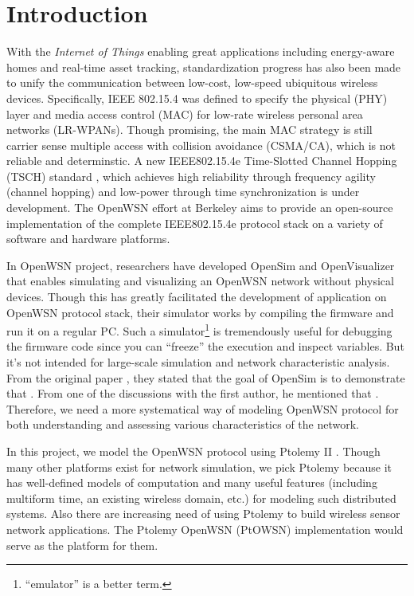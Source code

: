 \section{Introduction}
\label{sec:introduction}

With the {\em Internet of Things} enabling great applications including energy-aware homes and real-time asset tracking, standardization progress has also been made to unify the communication between low-cost, low-speed ubiquitous wireless devices. Specifically, IEEE 802.15.4 \cite{IEEE802.15.4} was defined to specify the physical (PHY) layer and media access control (MAC) for low-rate wireless personal area networks (LR-WPANs). Though promising, the main MAC strategy is still carrier sense multiple access with collision avoidance (CSMA/CA), which is not reliable and determinstic. A new IEEE802.15.4e Time-Slotted Channel Hopping (TSCH) standard \cite{IEEE802.15.4e}, which achieves high reliability through frequency agility (channel hopping) and low-power through time synchronization is under development. The OpenWSN \cite{watteyne2012openwsn} effort at Berkeley aims to provide an open-source implementation of the complete IEEE802.15.4e protocol stack on a variety of software and hardware platforms. 

In OpenWSN project, researchers have developed OpenSim and OpenVisualizer that enables simulating and visualizing an OpenWSN network without physical devices. Though this has greatly facilitated the development of application on OpenWSN protocol stack, their simulator works by compiling the firmware and run it on a regular PC. Such a simulator\footnote{ ``emulator'' is a better term.} is tremendously useful for debugging the firmware code since you can ``freeze'' the execution and inspect variables. But it's not intended for large-scale simulation and network characteristic analysis. From the original paper \cite{watteyne2012openwsn}, they stated that the goal of OpenSim is to demonstrate that . From one of the discussions with the first author, he mentioned that . Therefore, we need a more systematical way of modeling OpenWSN protocol for both understanding and assessing various characteristics of the network. 

In this project, we model the OpenWSN protocol using Ptolemy II \cite{PtolemyVol1:04, davis1999overview}. Though many other platforms \cite{mccanne1995ns, varga2001omnet++} exist for network simulation, we pick Ptolemy because it has well-defined models of computation and many useful features (including multiform time, an existing wireless domain, etc.) for modeling such distributed systems. Also there are increasing need of using Ptolemy to build wireless sensor network applications. The Ptolemy OpenWSN (PtOWSN) implementation would serve as the platform for them. 


